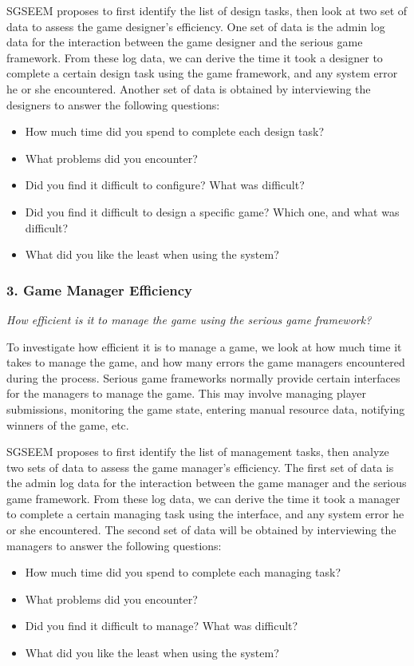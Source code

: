 \documentclass{sigchi}
\begin{document}
SGSEEM proposes to first identify the list of design tasks, then look at
two set of data to assess the game designer's efficiency. One set of
data is the admin log data for the interaction between the game designer
and the serious game framework. From these log data, we can derive the
time it took a designer to complete a certain design task using the game
framework, and any system error he or she encountered. Another set of
data is obtained by interviewing the designers to answer the following questions:
\begin{itemize}
    \item How much time did you spend to complete each design task?
    \item What problems did you encounter?
    \item Did you find it difficult to configure? What was difficult?
    \item Did you find it difficult to design a specific game? Which
      one, and what was difficult?
    \item What did you like the least when using the system?
\end{itemize}

\subsubsection{3. Game Manager Efficiency}

\emph{How efficient is it to manage the game using the serious game
  framework?}

To investigate how efficient it is to manage a game, we look at
how much time it takes to manage the game, and how many errors the
game managers encountered during the process. Serious game
frameworks normally provide certain interfaces for the managers to
manage the game. This may involve managing player submissions,
monitoring the game state, entering manual resource data, notifying
winners of the game, etc.

SGSEEM proposes to first identify the list of management tasks, then
analyze two sets of data to assess the game manager's efficiency. The
first set of data is the admin log data for the interaction between
the game manager and the serious game framework. From these log data,
we can derive the time it took a manager to complete a certain
managing task using the interface, and any system error he or she
encountered. The second set of data will be obtained by interviewing
the managers to answer the following questions:
\begin{itemize}
\item How much time did you spend to complete each managing task?
\item What problems did you encounter?
\item Did you find it difficult to manage? What was difficult?
\item What did you like the least when using the system?
\end{itemize}
\end{document}
